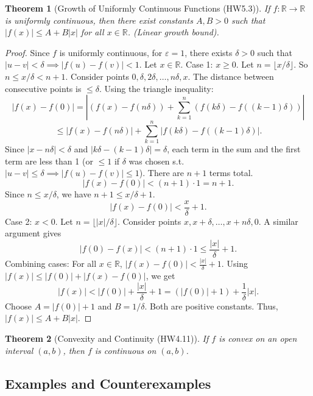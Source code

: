 \documentclass{article}
\theoremstyle{definition}
\theoremstyle{plain}
\newtheorem{theorem}{Theorem}[section]
\theoremstyle{remark}
\newcommand{\R}{\mathbb{R}}
\newcommand{\eps}{\varepsilon}
\begin{document}
\begin{theorem}[Growth of Uniformly Continuous Functions (HW5.3)] \label{thm:uc_growth}
If \(f: \R \to \R\) is uniformly continuous, then there exist constants \(A, B > 0\) such that \(|f(x)| \le A + B|x|\) for all \(x \in \R\). (Linear growth bound).
\end{theorem}
\begin{proof}
Since \(f\) is uniformly continuous, for \(\eps = 1\), there exists \(\delta > 0\) such that \(|u-v| < \delta \implies |f(u)-f(v)| < 1\).
Let \(x \in \R\).
Case 1: \(x \ge 0\). Let \(n = \lfloor x/\delta \rfloor\). So \(n \le x/\delta < n+1\). Consider points \(0, \delta, 2\delta, \dots, n\delta, x\). The distance between consecutive points is \(\le \delta\).
Using the triangle inequality:
\[ |f(x) - f(0)| = \left| (f(x) - f(n\delta)) + \sum_{k=1}^n (f(k\delta) - f((k-1)\delta)) \right| \]
\[ \le |f(x) - f(n\delta)| + \sum_{k=1}^n |f(k\delta) - f((k-1)\delta)|. \]
Since \(|x - n\delta| < \delta\) and \(|k\delta - (k-1)\delta| = \delta\), each term in the sum and the first term are less than 1 (or \(\le 1\) if \(\delta\) was chosen s.t. \(|u-v|\le \delta \implies |f(u)-f(v)| \le 1\)). There are \(n+1\) terms total.
\[ |f(x) - f(0)| < (n+1) \cdot 1 = n+1. \]
Since \(n \le x/\delta\), we have \(n+1 \le x/\delta + 1\).
\[ |f(x) - f(0)| < \frac{x}{\delta} + 1. \]
Case 2: \(x < 0\). Let \(n = \lfloor |x|/\delta \rfloor\). Consider points \(x, x+\delta, \dots, x+n\delta, 0\). A similar argument gives
\[ |f(0) - f(x)| < (n+1) \cdot 1 \le \frac{|x|}{\delta} + 1. \]
Combining cases: For all \(x \in \R\), \(|f(x) - f(0)| < \frac{|x|}{\delta} + 1\).
Using \(|f(x)| \le |f(0)| + |f(x)-f(0)|\), we get
\[ |f(x)| < |f(0)| + \frac{|x|}{\delta} + 1 = (|f(0)| + 1) + \frac{1}{\delta}|x|. \]
Choose \(A = |f(0)| + 1\) and \(B = 1/\delta\). Both are positive constants. Thus, \(|f(x)| \le A + B|x|\).
\end{proof}

\begin{theorem}[Convexity and Continuity (HW4.11)]
If \(f\) is convex on an open interval \((a, b)\), then \(f\) is continuous on \((a, b)\).
\end{theorem}

\subsection{Examples and Counterexamples}
\end{document}
